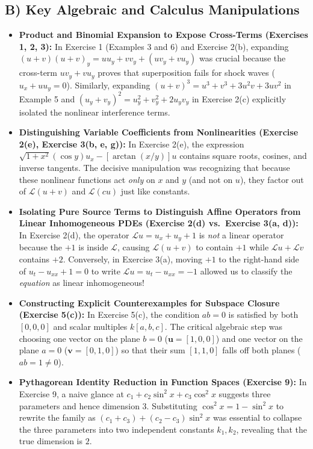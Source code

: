 \documentclass[11pt,a4paper]{article}
\begin{document}
\subsection{B) Key Algebraic and Calculus Manipulations}
\begin{itemize}
    \item \textbf{Product and Binomial Expansion to Expose Cross-Terms (Exercises 1, 2, 3):}
    In Exercise 1 (Examples 3 and 6) and Exercise 2(b), expanding $(u+v)(u+v)_y = u u_y + v v_y + (u v_y + v u_y)$ was crucial because the cross-term $u v_y + v u_y$ proves that superposition fails for shock waves ($u_x + u u_y = 0$). Similarly, expanding $(u+v)^3 = u^3 + v^3 + 3u^2 v + 3u v^2$ in Example 5 and $(u_y + v_y)^2 = u_y^2 + v_y^2 + 2u_y v_y$ in Exercise 2(c) explicitly isolated the nonlinear interference terms.
    \item \textbf{Distinguishing Variable Coefficients from Nonlinearities (Exercise 2(e), Exercise 3(b, e, g)):}
    In Exercise 2(e), the expression $\sqrt{1+x^2}(\cos y)u_x - [\arctan(x/y)]u$ contains square roots, cosines, and inverse tangents. The decisive manipulation was recognizing that because these nonlinear functions act \emph{only} on $x$ and $y$ (and not on $u$), they factor out of $\mathcal{L}(u+v)$ and $\mathcal{L}(cu)$ just like constants.
    \item \textbf{Isolating Pure Source Terms to Distinguish Affine Operators from Linear Inhomogeneous PDEs (Exercise 2(d) vs.\ Exercise 3(a, d)):}
    In Exercise 2(d), the operator $\mathcal{L}u = u_x + u_y + 1$ is \emph{not} a linear operator because the $+1$ is inside $\mathcal{L}$, causing $\mathcal{L}(u+v)$ to contain $+1$ while $\mathcal{L}u + \mathcal{L}v$ contains $+2$. Conversely, in Exercise 3(a), moving $+1$ to the right-hand side of $u_t - u_{xx} + 1 = 0$ to write $\mathcal{L}u = u_t - u_{xx} = -1$ allowed us to classify the \emph{equation} as linear inhomogeneous!
    \item \textbf{Constructing Explicit Counterexamples for Subspace Closure (Exercise 5(c)):}
    In Exercise 5(c), the condition $ab = 0$ is satisfied by both $[0,0,0]$ and scalar multiples $k[a,b,c]$. The critical algebraic step was choosing one vector on the plane $b=0$ ($\mathbf{u}=[1,0,0]$) and one vector on the plane $a=0$ ($\mathbf{v}=[0,1,0]$) so that their sum $[1,1,0]$ falls off both planes ($ab = 1 \neq 0$).
    \item \textbf{Pythagorean Identity Reduction in Function Spaces (Exercise 9):}
    In Exercise 9, a naive glance at $c_1 + c_2\sin^2 x + c_3\cos^2 x$ suggests three parameters and hence dimension 3. Substituting $\cos^2 x = 1 - \sin^2 x$ to rewrite the family as $(c_1 + c_3) + (c_2 - c_3)\sin^2 x$ was essential to collapse the three parameters into two independent constants $k_1, k_2$, revealing that the true dimension is $2$.

\end{itemize}
\end{document}
